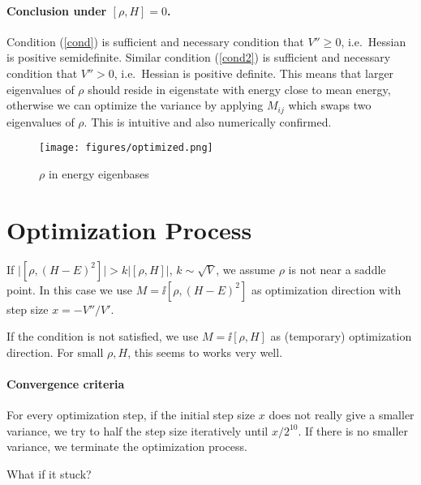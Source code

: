 \documentclass[10pt]{article}
\begin{document}
\paragraph{Conclusion under $[\rho, H]=0$.} Condition (\ref{cond}) is sufficient and necessary condition that $V''\geq 0$, i.e.\ Hessian is positive semidefinite. Similar condition (\ref{cond2}) is sufficient and necessary condition that $V''> 0$, i.e.\ Hessian is positive definite. This means that larger eigenvalues of $\rho$ should reside in eigenstate with energy close to mean energy, otherwise we can optimize the variance by applying $M_{ij}$ which swaps two eigenvalues of $\rho$. This is intuitive and also numerically confirmed.
\begin{figure}[htb]
\centering
\texttt{[image: figures/optimized.png]}
\caption{$\rho$ in energy eigenbases}
\end{figure} 
\section{Optimization Process}
If $\big|[\rho, (H-E)^2]\big|>k\big|[\rho, H]\big|$, $k\sim\sqrt{V}$, we assume $\rho$ is not near a saddle point. In this case we use $M=\ii[\rho, (H-E)^2]$ as optimization direction with step size $x=-V''/V'$. 

If the condition is not satisfied, we use $M=\ii [\rho, H]$ as (temporary) optimization direction. For small $\rho, H$, this seems to works very well.

\paragraph{Convergence criteria} For every optimization step, if the initial step size $x$ does not really give a smaller variance, we try to half the step size iteratively until $x/2^{10}$. If there is no smaller variance, we terminate the optimization process. 

What if it stuck?
\end{document}
